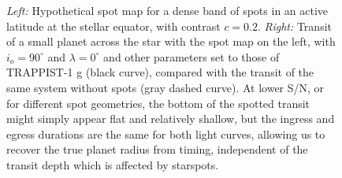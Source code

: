 \begin{subappendices}
\begin{figure}
    \caption{\textsl{Left:} Hypothetical spot map for a dense band of spots in an active latitude at the stellar equator, with contrast $c=0.2$. \textsl{Right:} Transit of a small planet across the star with the spot map on the left, with $i_o = 90^\circ$ and $\lambda = 0^\circ$ and other parameters set to those of TRAPPIST-1 g (black curve), compared with the transit of the same system without spots (gray dashed curve). At lower S/N, or for different spot geometries, the bottom of the spotted transit might simply appear flat and relatively shallow, but the ingress and egress durations are the same for both light curves, allowing us to recover the true planet radius from timing, independent of the transit depth which is affected by starspots.}
    \label{fig:map4}
\end{figure}



\end{subappendices}
